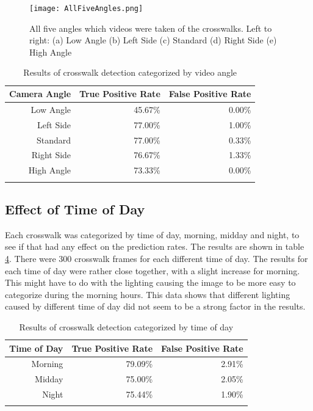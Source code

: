\documentclass[12pt]{ucthesis}
\newcommand{\captionfonts}{\small\bf\ssp}
\begin{document}
\begin{figure}[t]
\begin{center}
\texttt{[image: AllFiveAngles.png]}
\captionfonts
\caption[All Five Different Crosswalk Angles]{All five angles which videos were taken of the crosswalks. Left to right: (a) Low Angle (b) Left Side (c) Standard (d) Right Side (e) High Angle}
\label{fig:AllFiveAngles}
\end{center}
\end{figure}

\begin{table}[t]
    \begin{longtable}{|r|r|r|}
    \hline
    Camera Angle & True Positive Rate & False Positive Rate \bigstrut\\
    \hline
    Low Angle & 45.67\% & 0.00\% \bigstrut\\
    \hline
    Left Side & 77.00\% & 1.00\% \bigstrut\\
    \hline
    Standard & 77.00\% & 0.33\% \bigstrut\\
    \hline
    Right Side & 76.67\% & 1.33\% \bigstrut\\
    \hline
    High Angle & 73.33\% & 0.00\% \bigstrut\\
    \hline


    \caption{Results of crosswalk detection categorized by video angle}
    \label{tab:downbad} 
    \end{longtable}
\end{table}

\clearpage

\subsection{Effect of Time of Day}
Each crosswalk was categorized by time of day, morning, midday and night, to see if that had any effect on the prediction rates. The results are shown in table \ref{tab:timeofday}. There were 300 crosswalk frames for each different time of day. The results for each time of day were rather close together, with a slight increase for morning. This might have to do with the lighting causing the image to be more easy to categorize during the morning hours. This data shows that different lighting caused by different time of day did not seem to be a strong factor in the results.

\begin{table}[t]
    \begin{longtable}{|r|r|r|}
    \hline
    Time of Day & True Positive Rate & False Positive Rate \bigstrut\\
    \hline
    Morning & 79.09\% & 2.91\% \bigstrut\\
    \hline
    Midday & 75.00\% & 2.05\% \bigstrut\\
    \hline
    Night & 75.44\% & 1.90\% \bigstrut\\
    \hline

    \caption{Results of crosswalk detection categorized by time of day}
    \label{tab:timeofday} 
    \end{longtable}
\end{table}
\end{document}
